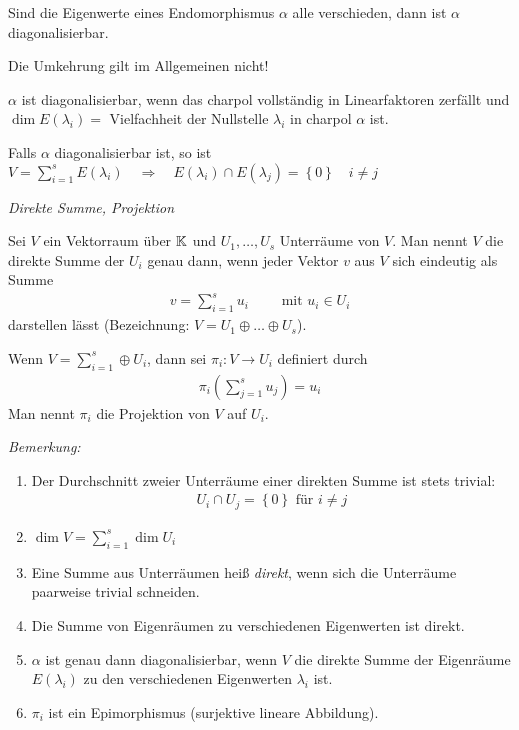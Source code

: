 Sind die Eigenwerte eines Endomorphismus $\alpha$ alle verschieden, dann ist $\alpha$ diagonalisierbar.
\begin{center}
Die Umkehrung gilt im Allgemeinen nicht!
\end{center}
$\alpha$ ist diagonalisierbar, wenn das charpol vollständig in Linearfaktoren zerfällt und $\dim E(\lambda_i)=$ Vielfachheit der Nullstelle 
$\lambda_i$ in charpol $\alpha$ ist.

Falls $\alpha$ diagonalisierbar ist, so ist $V=\sum\limits_{i=1}^s E(\lambda_i) \quad \Rightarrow \quad E\left( \lambda_i \right) \cap E \left( \lambda_j \right) = \left\{ 0 \right\} \quad i \neq j$

\begin{mydef}\textit{Direkte Summe, Projektion}\medskip

    Sei $V$ ein Vektorraum über $\mathbb{K}$ und $U_1,\ldots,U_s$ Unterräume von $V$. Man nennt $V$ die direkte Summe der $U_i$ genau dann, wenn jeder Vektor $v$ aus $V$ sich eindeutig als Summe
    \begin{align*}
        v=\sum_{i=1}^s u_i \qquad \mbox{ mit } u_i\in U_i
    \end{align*}
    darstellen lässt (Bezeichnung: $V = U_1 \oplus \ldots \oplus U_s$).

    Wenn $V = \sum\limits_{i=1}^s \oplus U_i$, dann sei $\pi_i:V\rightarrow U_i$ definiert durch
    \begin{align*}
        \pi_i \left( \sum_{j=1}^s u_j \right) = u_i
    \end{align*}
    Man nennt $\pi_i$ die Projektion von $V$ auf $U_i$.
\end{mydef}

\textit{Bemerkung:}
\begin{enumerate}
    \item Der Durchschnitt zweier Unterräume einer direkten Summe ist stets trivial:
        \begin{align*}
            U_i \cap U_j = \left\{  0 \right\} \mbox{ für } i \neq j
        \end{align*}
    \item $\dim V=\sum\limits_{i=1}^s\dim U_i$
    \item Eine Summe aus Unterräumen heiß \textit{direkt}, wenn sich die Unterräume paarweise trivial schneiden.
    \item Die Summe von Eigenräumen zu verschiedenen Eigenwerten ist direkt.
    \item $\alpha$ ist genau dann diagonalisierbar, wenn $V$ die direkte Summe der Eigenräume $E(\lambda_i)$ zu den verschiedenen Eigenwerten $\lambda_i$ ist.
    \item $\pi_i$ ist ein Epimorphismus (surjektive lineare Abbildung).
\end{enumerate}

